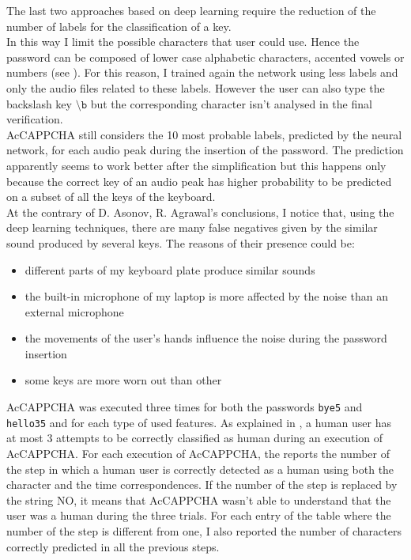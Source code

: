 The last two approaches based on deep learning require the reduction of the number of labels for the classification of a key.\\
In this way I limit the possible characters that user could use. Hence the password can be composed of lower case alphabetic characters, accented vowels or numbers (see ). For this reason, I trained again the network using less labels and only the audio files related to these labels. However the user can also type the backslash key $\mathtt{\setminus b}$ but the corresponding character isn't analysed in the final verification.\\
AcCAPPCHA still considers the 10 most probable labels, predicted by the neural network, for each audio peak during the insertion of the password. The prediction apparently seems to work better after the simplification but this happens only because the correct key of an audio peak has higher probability to be predicted on a subset of all the keys of the keyboard.\\
At the contrary of D. Asonov, R. Agrawal's conclusions\cite{keyboard_acoustic}, I notice that, using the deep learning techniques, there are many false negatives given by the similar sound produced by several keys. The reasons of their presence could be:
\begin{itemize}
\item{different parts of my keyboard plate produce similar sounds}
\item{the built-in microphone of my laptop is more affected by the noise than an external microphone}
\item{the movements of the user's hands influence the noise during the password insertion}
\item{some keys are more worn out than other} 
\end{itemize}
AcCAPPCHA was executed three times for both the passwords \texttt{bye5} and \texttt{hello35} and for each type of used features. As explained in , a human user has at most 3 attempts to be correctly classified as human during an execution of AcCAPPCHA. For each execution of AcCAPPCHA, the  reports the number of the step in which a human user is correctly detected as a human using both the character and the time correspondences. If the number of the step is replaced by the string NO, it means that AcCAPPCHA wasn't able to understand that the user was a human during the three trials. For each entry of the table where the number of the step is different from one, I also reported the number of characters correctly predicted in all the previous steps.\\

